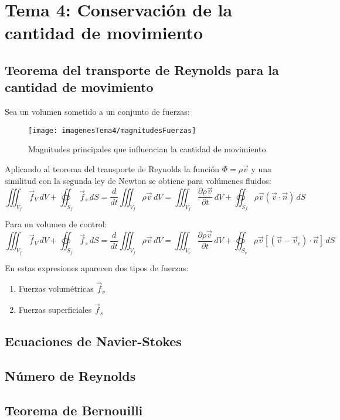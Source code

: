 \section{Tema 4: Conservación de la cantidad de movimiento}
\subsection{Teorema del transporte de Reynolds para la cantidad de movimiento}
Sea un volumen sometido a un conjunto de fuerzas:
\begin{figure}[H]
	\centering
	\texttt{[image: imagenesTema4/magnitudesFuerzas]}
	\caption{Magnitudes principales que influencian la cantidad de movimiento.}
	\label{fig:magnitudesfuerzas}
\end{figure}

Aplicando al teorema del transporte de Reynolds la función $\Phi=\rho\vec{v}$ y una similitud con la segunda ley de Newton se obtiene para volúmenes fluidos:
\[\iiint_{V_f}\vec{f}_V\,dV+\oiint_{S_f}\vec{f}_s\,dS=
\frac{d}{dt}\iiint_{V_f}\rho\vec{v}\,dV=
\iiint_{V_f}\frac{\partial \rho\vec{v}}{\partial t}\,dV+\oiint_{S_f}\rho\vec{v}\left(\vec{v}\cdot\vec{n}\right)\,dS\]

Para un volumen de control:
\[\iiint_{V_f}\vec{f}_V\,dV+\oiint_{S_f}\vec{f}_s\,dS=
\frac{d}{dt}\iiint_{V_f}\rho\vec{v}\,dV=
\iiint_{V_c}\frac{\partial \rho\vec{v}}{\partial t}\,dV
+\oiint_{S_c}\rho\vec{v}\left[\left(\vec{v}-\vec{v}_c\right)\cdot\vec{n}\right]\,dS\]

En estas expresiones aparecen dos tipos de fuerzas:
\begin{enumerate}
	\item Fuerzas volumétricas $\vec{f}_v$
	\item Fuerzas superficiales $\vec{f}_s$
\end{enumerate}
\subsection{Ecuaciones de Navier-Stokes}

\subsection{Número de Reynolds}

\subsection{Teorema de Bernouilli}
